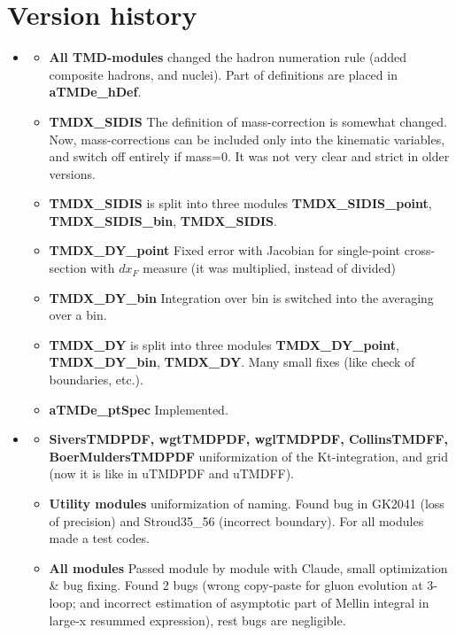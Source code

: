 \documentclass[prd,nofootinbib,eqsecnum,final]{revtex4}
\renewcommand{\(}{\left(}
\renewcommand{\)}{\right)}
\renewcommand{\[}{\left[}
\renewcommand{\]}{\right]}
\newcommand{\red}[1]{{\color[rgb]{1,0,0} #1}}
\begin{document}
\section{Version history}
\begin{itemize}
\item[\textbf{Ver.3.05}]
\begin{itemize}
	\item \textbf{All TMD-modules} changed the hadron numeration rule (added composite hadrons, and nuclei). Part of definitions are placed in \textbf{aTMDe\_hDef}.
	\item \textbf{TMDX\_SIDIS} The definition of mass-correction is somewhat changed. Now, mass-corrections can be included only into the kinematic variables, and switch off entirely if mass=0. It was not very clear and strict in older versions.
	\item \textbf{TMDX\_SIDIS} is split into three modules \textbf{TMDX\_SIDIS\_point}, \textbf{TMDX\_SIDIS\_bin}, \textbf{TMDX\_SIDIS}. 
	\item \textbf{TMDX\_DY\_point} Fixed error with Jacobian for single-point cross-section with $dx_F$ measure (it was multiplied, instead of divided)
	\item \textbf{TMDX\_DY\_bin} Integration over bin is switched into the averaging over a bin.
	\item \textbf{TMDX\_DY} is split into three modules \textbf{TMDX\_DY\_point}, \textbf{TMDX\_DY\_bin}, \textbf{TMDX\_DY}. Many small fixes (like check of boundaries, etc.).
	\item \textbf{aTMDe\_ptSpec} Implemented.
\end{itemize}
\item[\textbf{Ver.3.04}]
\begin{itemize}
	\item \textbf{SiversTMDPDF, wgtTMDPDF, wglTMDPDF, CollinsTMDFF, BoerMuldersTMDPDF} uniformization of the Kt-integration, and grid (now it is like in uTMDPDF and uTMDFF).
	\item \textbf{Utility modules} uniformization of naming. Found bug in GK2041 (loss of precision) and Stroud35\_56 (incorrect boundary). For all modules made a test codes.
	\item \textbf{\red{All modules}} Passed module by module with Claude, small optimization \& bug fixing. Found 2 bugs (wrong copy-paste for gluon evolution at 3-loop; and incorrect estimation of asymptotic part of Mellin integral in large-x resummed expression), rest bugs are negligible.
\end{itemize}

\end{itemize}
\end{document}
